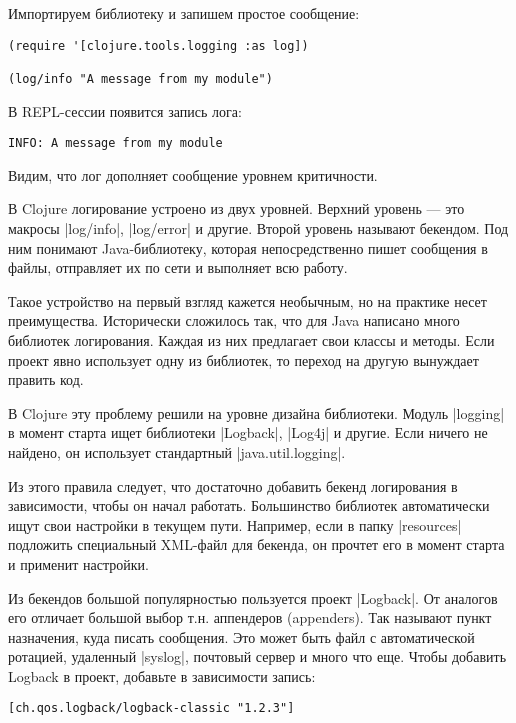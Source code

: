 Импортируем библиотеку и запишем простое сообщение:

\begin{verbatim}
(require '[clojure.tools.logging :as log])

(log/info "A message from my module")
\end{verbatim}

В REPL-сессии появится запись лога:

\begin{verbatim}
INFO: A message from my module
\end{verbatim}

Видим, что лог дополняет сообщение уровнем критичности.

В Clojure логирование устроено из двух уровней. Верхний уровень — это макросы
\spverb|log/info|, \spverb|log/error| и другие. Второй уровень называют бекендом. Под ним
понимают Java-библиотеку, которая непосредственно пишет сообщения в файлы,
отправляет их по сети и выполняет всю работу.

Такое устройство на первый взгляд кажется необычным, но на практике несет
преимущества. Исторически сложилось так, что для Java написано много библиотек
логирования. Каждая из них предлагает свои классы и методы. Если проект явно
использует одну из библиотек, то переход на другую вынуждает править код.

В Clojure эту проблему решили на уровне дизайна библиотеки. Модуль \spverb|logging| в
момент старта ищет библиотеки \spverb|Logback|, \spverb|Log4j| и другие. Если ничего не
найдено, он использует стандартный \spverb|java.util.logging|.

Из этого правила следует, что достаточно добавить бекенд логирования в
зависимости, чтобы он начал работать. Большинство библиотек автоматически ищут
свои настройки в текущем пути. Например, если в папку \spverb|resources| подложить
специальный XML-файл для бекенда, он прочтет его в момент старта и применит
настройки.

Из бекендов большой популярностью пользуется проект \spverb|Logback|. От аналогов его
отличает большой выбор т.н. аппендеров (appenders). Так называют пункт
назначения, куда писать сообщения. Это может быть файл с автоматической
ротацией, удаленный \spverb|syslog|, почтовый сервер и много что еще. Чтобы добавить
Logback в проект, добавьте в зависимости запись:

\begin{verbatim}
[ch.qos.logback/logback-classic "1.2.3"]
\end{verbatim}

